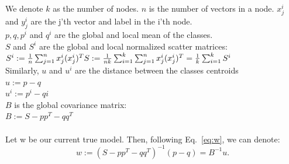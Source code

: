 \documentclass[11pt,twocolumn,varwidth=true,a4paper,fleqn]{article}
\begin{document}
We denote $k$ as the number of nodes.
$n$ is the number of vectors in a node.
$x^i_j$ and $y^i_j$ are the j'th vector and label in the i'th node.
\\$p,q,p^i$ and $q^i$  are the global and local mean of the classes.
\\$S$ and $S^i$  are the global and local normalized scatter matrices:
\\$S^i := \frac{1}{n}\sum_{j=1}^{n}x^i_j(x^i_j)^T
\\S := \frac{1}{nk}
\sum_{i=1}^k\sum_{j=1}^nx^i_j(x^i_j)^T=\frac{1}{k}\sum_{i=1}^kS^i$
\\Similarly, $u$ and $u^i$ are the distance between the classes centroids
\\$u:=p - q$
\\$u^i:=p^i - qi$
\\ $B$ is the global covariance matrix:
\\$B:=S - pp^T - qq^T$
\\\\Let w be our current true model. Then, following Eq.~\ref{eq:w}, we can
denote:
\begin{equation*}
w:=(S - pp^T - qq^T)^{-1}(p-q)=B^{-1}u.
\end{equation*}
\end{document}
